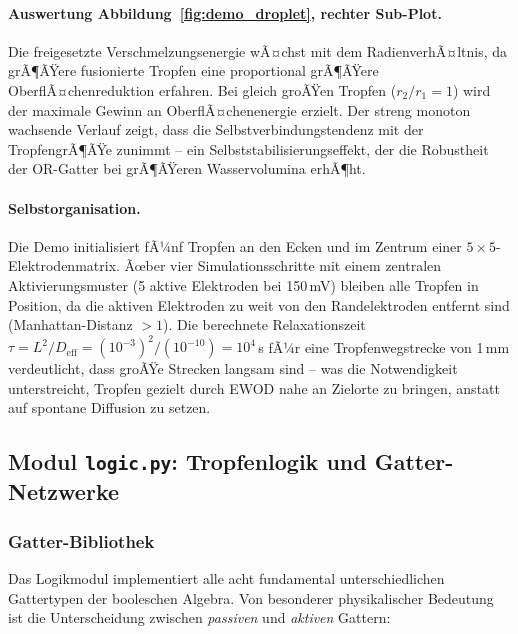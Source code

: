 ﻿\documentclass[a4paper,12pt]{scrreprt}
\theoremstyle{definition}
\begin{document}
\paragraph{Auswertung Abbildung~\ref{fig:demo_droplet}, rechter Sub-Plot.}
Die freigesetzte Verschmelzungsenergie wÃ¤chst mit dem RadienverhÃ¤ltnis,
da grÃ¶ÃŸere fusionierte Tropfen eine proportional grÃ¶ÃŸere OberflÃ¤chenreduktion
erfahren. Bei gleich groÃŸen Tropfen ($r_2/r_1 = 1$) wird der maximale Gewinn
an OberflÃ¤chenenergie erzielt. Der streng monoton wachsende Verlauf zeigt,
dass die Selbstverbindungstendenz mit der TropfengrÃ¶ÃŸe zunimmt -- ein
Selbststabilisierungseffekt, der die Robustheit der OR-Gatter bei grÃ¶ÃŸeren
Wasservolumina erhÃ¶ht.

\paragraph{Selbstorganisation.}
Die Demo initialisiert fÃ¼nf Tropfen an den Ecken und im Zentrum einer
$5 \times 5$-Elektrodenmatrix. Ãœber vier Simulationsschritte mit einem
zentralen Aktivierungsmuster (5 aktive Elektroden bei 150\,mV) bleiben
alle Tropfen in Position, da die aktiven Elektroden zu weit von den
Randelektroden entfernt sind (Manhattan-Distanz $> 1$). Die berechnete
Relaxationszeit $\tau = L^2/D_\text{eff} = (10^{-3})^2/(10^{-10}) = 10^4$\,s
fÃ¼r eine Tropfenwegstrecke von 1\,mm verdeutlicht, dass groÃŸe Strecken
langsam sind -- was die Notwendigkeit unterstreicht, Tropfen gezielt durch
EWOD nahe an Zielorte zu bringen, anstatt auf spontane Diffusion zu setzen.

\subsection{Modul \texttt{logic.py}: Tropfenlogik und Gatter-Netzwerke}
\label{subsec:demo_logic}

\subsubsection{Gatter-Bibliothek}

Das Logikmodul implementiert alle acht fundamental unterschiedlichen
Gattertypen der booleschen Algebra. Von besonderer physikalischer Bedeutung
ist die Unterscheidung zwischen \emph{passiven} und \emph{aktiven} Gattern:
\end{document}
